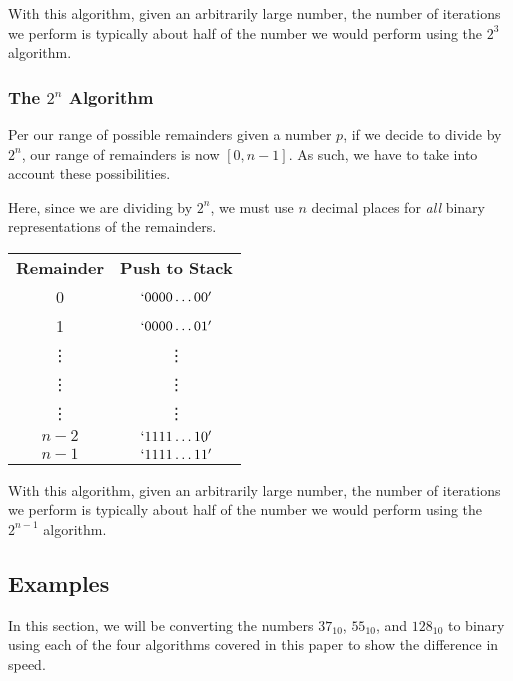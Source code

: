 \documentclass[12pt]{article}
\begin{document}
\par With this algorithm, given an arbitrarily large number, the number of iterations we perform is typically about half of the number we would perform using the $2^3$ algorithm.

\subsubsection{The $2^n$ Algorithm}
Per our range of possible remainders given a number $p$, if we decide to divide by $2^n$, our range of remainders is now $[0,n-1]$. As such, we have to take into account these possibilities.

\par Here, since we are dividing by $2^n$, we must use $n$ decimal places for \textit{all} binary representations of the remainders.

\begin{center}
  \begin{tabular}{c|c}
    \textbf{Remainder} & \textbf{Push to Stack} \\
    0      & $`0000\dots00'$ \\
    1      & $`0000\dots01'$ \\
    \vdots & \vdots \\
    \vdots & \vdots \\
    \vdots & \vdots \\
    $n-2$  & $`1111\dots10'$ \\
    $n-1$    & $`1111\dots11'$
  \end{tabular}
\end{center}

\par With this algorithm, given an arbitrarily large number, the number of iterations we perform is typically about half of the number we would perform using the $2^{n-1}$ algorithm.



\newpage %



\begin{center}
  \section{Examples}
\end{center}
In this section, we will be converting the numbers $37_{10}$, $55_{10}$, and $128_{10}$ to binary using each of the four algorithms covered in this paper to show the difference in speed.
\end{document}
